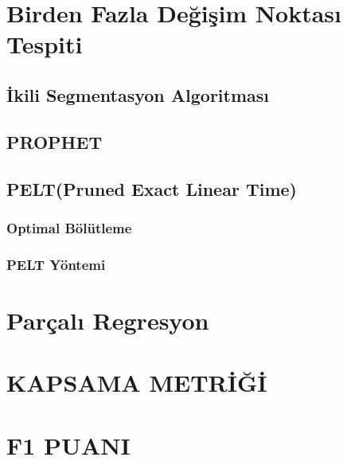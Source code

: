 \documentclass[12pt,twoside]{deuthesis}
\begin{document}
\hypertarget{birden-fazla-deux11fiux15fim-noktasux131-tespiti}{%
\section{Birden Fazla Değişim Noktası Tespiti}\label{birden-fazla-deux11fiux15fim-noktasux131-tespiti}}

\hypertarget{ikili-segmentasyon-algoritmasux131}{%
\subsection{İkili Segmentasyon Algoritması}\label{ikili-segmentasyon-algoritmasux131}}

\hypertarget{prophet}{%
\subsection{PROPHET}\label{prophet}}

\hypertarget{peltpruned-exact-linear-time}{%
\subsection{PELT(Pruned Exact Linear Time)}\label{peltpruned-exact-linear-time}}

\hypertarget{optimal-buxf6luxfctleme}{%
\subsubsection{Optimal Bölütleme}\label{optimal-buxf6luxfctleme}}

\hypertarget{pelt-yuxf6ntemi}{%
\subsubsection{PELT Yöntemi}\label{pelt-yuxf6ntemi}}

\hypertarget{paruxe7alux131-regresyon}{%
\section{Parçalı Regresyon}\label{paruxe7alux131-regresyon}}

\hypertarget{kapsama-metriux11fi}{%
\section{KAPSAMA METRİĞİ}\label{kapsama-metriux11fi}}

\hypertarget{f1-puani}{%
\section{F1 PUANI}\label{f1-puani}}
\end{document}
